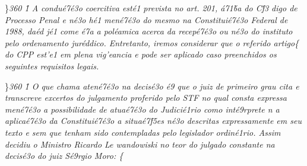  \ltrch{} 
\par \}\pard\plain \ltrpar\qj {}\sl360\widctlpar\wrapdefault\faauto{} \rtlch{}  \ltrch{} \f1\cgrid{} {\rtlch{}  \ltrch{} 
 A condu\'e7\'e3o coercitiva est\'e1 prevista no art. }{\rtlch{}  \ltrch{}  201, \'a71\'ba }{\rtlch{}  \ltrch{}  do C\'f3
digo de Processo Penal e n\'e3o h\'e1 men\'e7\'e3o do mesmo na Constitui\'e7\'e3o Federal de 1988, }{\rtlch{}  \ltrch{}  da\'ed}{\rtlch{}  \ltrch{}   j\'e1 come
\'e7a a pol\'eamica acerca da recep\'e7\'e3o ou n\'e3o do instituto pelo ordenamento jur\'eddico. Entretanto, iremos considerar que o }{\rtlch{}  \ltrch{}  referido artigo}\{\rtlch{}
 \ltrch{}  do CPP est'e1 em
plena vig'eancia e pode ser aplicado caso preenchidos os seguintes
requisitos legais.
\par \}\pard\plain \ltrpar{}\qj {}\sl360\widctlpar\wrapdefault\aspalpha\aspnum\faauto\adjustright{} \rtlch{}  \ltrch{} 
\f1\cgrid{} {\rtlch{}  \ltrch{}  O que chama aten\'e7\'e3o na decis\'e3o \'e9
 que o juiz de primeiro grau cita e transcreve excertos do julgamento proferido pelo STF no qual consta expressa men\'e7\'e3o a possibilidade de atua\'e7\'e3o do Judici\'e1rio como int\'e9rprete n}{\rtlch{}  \ltrch{} 
 a aplica\'e7\'e3o da Constitui\'e7\'e3o a situa\'e7\'f5es n\'e3o descritas expressamente em seu texto e sem que tenham sido contempladas pelo legislador ordin\'e1rio. Assim decidiu o Ministro Ricardo Le
wandowiski no teor do julgado constante na decis\'e3o do juiz S\'e9rgio Moro: }\{\rtlch{}
 \ltrch{} 
